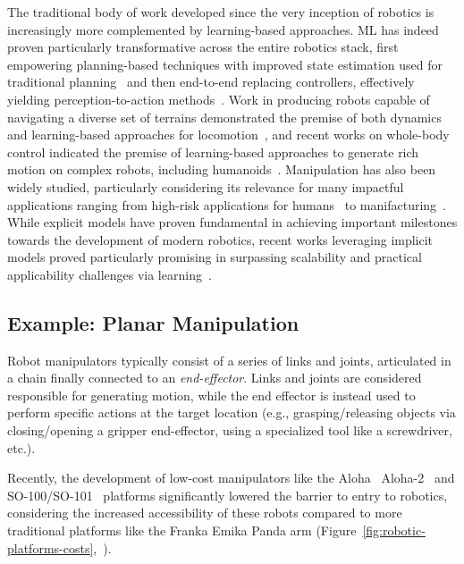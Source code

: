 The traditional body of work developed since the very inception of robotics is increasingly more complemented by learning-based approaches.
ML has indeed proven particularly transformative across the entire robotics stack, first empowering planning-based techniques with improved state estimation used for traditional planning~\citep{tangPerceptionNavigationAutonomous2023} and then end-to-end replacing controllers, effectively yielding perception-to-action methods~\citep{koberReinforcementLearningRobotics}.
Work in producing robots capable of navigating a diverse set of terrains demonstrated the premise of both dynamics and learning-based approaches for locomotion~\citep{griffinWalkingStabilizationUsing2017,jiDribbleBotDynamicLegged2023,leeLearningQuadrupedalLocomotion2020,margolisRapidLocomotionReinforcement2022}, and recent works on whole-body control indicated the premise of learning-based approaches to generate rich motion on complex robots, including humanoids~\citep{zhangWoCoCoLearningWholeBody2024,nvidiaGR00TN1Open2025}.
Manipulation has also been widely studied, particularly considering its relevance for many impactful applications ranging from high-risk applications for humans~\citep{fujitaDevelopmentRobotsNuclear2020,alizadehComprehensiveSurveySpace2024,fujitaDevelopmentRobotsNuclear2020} to manifacturing~\citep{sannemanStateIndustrialRobotics2020}.
While explicit models have proven fundamental in achieving important milestones towards the development of modern robotics, recent works leveraging implicit models proved particularly promising in surpassing scalability and practical applicability challenges via learning~\citep{koberReinforcementLearningRobotics}.

\subsection{Example: Planar Manipulation}
Robot manipulators typically consist of a series of links and joints, articulated in a chain finally connected to an \emph{end-effector}.
Links and joints are considered responsible for generating motion, while the end effector is instead used to perform specific actions at the target location (e.g., grasping/releasing objects via closing/opening a gripper end-effector, using a specialized tool like a screwdriver, etc.).

Recently, the development of low-cost manipulators like the Aloha~\citep{zhaoLearningFineGrainedBimanual2023} Aloha-2~\citep{aldacoALOHA2Enhanced} and SO-100/SO-101~\citep{knightStandardOpenSO100} platforms significantly lowered the barrier to entry to robotics, considering the increased accessibility of these robots compared to more traditional platforms like the Franka Emika Panda arm (Figure~\ref{fig:robotic-platforms-costs},~\citep{knightStandardOpenSO100}).


